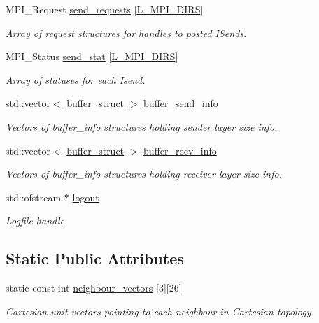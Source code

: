 \begin{DoxyCompactItemize}
M\+P\+I\+\_\+\+Request \hyperlink{class_mpi_manager_ae4ba6735840e949dff5cd63ab1695ff0}{send\+\_\+requests} \mbox{[}\hyperlink{definitions_8h_a144328eed4e90ebcf8a9f66aa7337266}{L\+\_\+\+M\+P\+I\+\_\+\+D\+I\+RS}\mbox{]}
\begin{DoxyCompactList}\small\item\em Array of request structures for handles to posted I\+Sends. \end{DoxyCompactList}\item 
M\+P\+I\+\_\+\+Status \hyperlink{class_mpi_manager_a3ccb49ceda719f0c6bb90593a880a730}{send\+\_\+stat} \mbox{[}\hyperlink{definitions_8h_a144328eed4e90ebcf8a9f66aa7337266}{L\+\_\+\+M\+P\+I\+\_\+\+D\+I\+RS}\mbox{]}
\begin{DoxyCompactList}\small\item\em Array of statuses for each Isend. \end{DoxyCompactList}\item 
std\+::vector$<$ \hyperlink{struct_mpi_manager_1_1buffer__struct}{buffer\+\_\+struct} $>$ \hyperlink{class_mpi_manager_a3a91c2e8cfb15027a0681c198f82d257}{buffer\+\_\+send\+\_\+info}
\begin{DoxyCompactList}\small\item\em Vectors of buffer\+\_\+info structures holding sender layer size info. \end{DoxyCompactList}\item 
std\+::vector$<$ \hyperlink{struct_mpi_manager_1_1buffer__struct}{buffer\+\_\+struct} $>$ \hyperlink{class_mpi_manager_a5e769fa077d24d62d10a9a0d303009d1}{buffer\+\_\+recv\+\_\+info}
\begin{DoxyCompactList}\small\item\em Vectors of buffer\+\_\+info structures holding receiver layer size info. \end{DoxyCompactList}\item 
std\+::ofstream $\ast$ \hyperlink{class_mpi_manager_a9a0dd93f57d78f568048197c95311832}{logout}
\begin{DoxyCompactList}\small\item\em Logfile handle. \end{DoxyCompactList}\end{DoxyCompactItemize}
\subsection*{Static Public Attributes}
\begin{DoxyCompactItemize}
\item 
static const int \hyperlink{class_mpi_manager_a0c5f58ce12a1a8002cb124bf61e80d09}{neighbour\+\_\+vectors} \mbox{[}3\mbox{]}\mbox{[}26\mbox{]}
\begin{DoxyCompactList}\small\item\em Cartesian unit vectors pointing to each neighbour in Cartesian topology. \end{DoxyCompactList}\end{DoxyCompactItemize}


